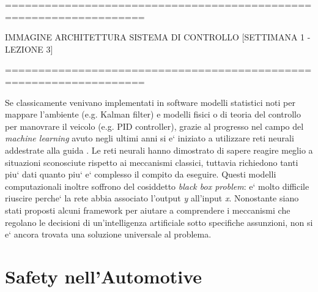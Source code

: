 ===================================================================

IMMAGINE ARCHITETTURA SISTEMA DI CONTROLLO
[SETTIMANA 1 - LEZIONE 3]

===================================================================
\newline\newline

Se classicamente venivano implementati in software modelli statistici noti per mappare l'ambiente (e.g. Kalman filter) e modelli fisici o di teoria del controllo per manovrare il veicolo (e.g. PID controller), grazie al progresso nel campo del \textsl{machine learning} avuto negli ultimi anni si e` iniziato a utilizzare reti neurali addestrate alla guida \cite{1} \cite{2}.\newline
Le reti neurali hanno dimostrato di sapere reagire meglio a situazioni sconosciute rispetto ai meccanismi classici, tuttavia richiedono tanti piu` dati quanto piu` e` complesso il compito da eseguire.\newline
Questi modelli computazionali inoltre soffrono del cosiddetto \textsl{black box problem}: e` molto difficile riuscire perche` la rete abbia associato l'output \textsl{y} all'input \textsl{x}. Nonostante siano stati proposti alcuni framework \cite{3} per aiutare a comprendere i meccanismi che regolano le decisioni di un'intelligenza artificiale sotto specifiche assunzioni, non si e` ancora trovata una soluzione universale al problema.\newline


\section{Safety nell'Automotive}

